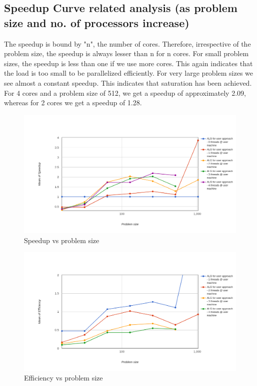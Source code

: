 \documentclass[runningheads, a4paper, oribibl]{llncs}
\begin{document}
\subsection{Speedup Curve related analysis (as problem size and no. of processors increase)}
The speedup is bound by "n", the number of cores. Therefore, irrespective of the problem size, the speedup is always lesser than n for n cores. For small problem sizes, the speedup is less than one if we use more cores. This again indicates that the load is too small to be parallelized efficiently. For very large problem sizes we see almost a constant speedup. This indicates that saturation has been achieved.  For 4 cores and a problem size of 512,  we get a speedup of approximately 2.09, whereas for 2 cores we get a speedup of 1.28.
\newpage
\begin{figure}[t]
    \centering
    \includegraphics[width=\textwidth]{p5.png}
    \caption{Speedup vs problem size}
    \label{fig:p5}
\end{figure}
\begin{figure}[b]
    \centering
    \includegraphics[width=\textwidth]{p6.png}
    \caption{Efficiency vs problem size}
    \label{fig:p6}
\end{figure}
\newpage
\end{document}
